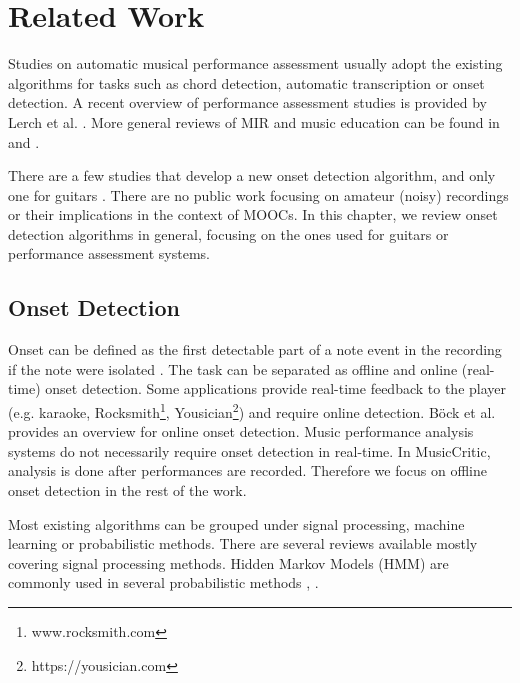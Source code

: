 \chapter{Related Work}

Studies on automatic musical performance assessment usually adopt the existing algorithms for tasks such as chord detection, automatic transcription or onset detection. A recent overview of performance assessment studies is provided by Lerch et al. \cite{lerch2019mpa}. More general reviews of MIR and music education can be found in \cite{dittmar2012} and \cite{percival2007effective}. 

There are a few studies that develop a new onset detection algorithm, and only one for guitars \cite{eremenko2020performance}. There are no public work focusing on amateur (noisy) recordings or their implications in the context of MOOCs. In this chapter, we review onset detection algorithms in general, focusing on the ones used for guitars or performance assessment systems. 

\section{Onset Detection}

Onset can be defined as the first detectable part of a note event in the recording if the note were isolated \cite{leveau2004}. The task can be separated as offline and online (real-time) onset detection. Some applications provide real-time feedback to the player (e.g. karaoke, Rocksmith\footnote{www.rocksmith.com}, Yousician\footnote{https://yousician.com}) and require online detection. B{\"o}ck et al. \cite{bock2012evaluating} provides an overview for online onset detection. Music performance analysis systems do not necessarily require onset detection in real-time. In MusicCritic, analysis is done after performances are recorded. Therefore we focus on offline onset detection in the rest of the work.

Most existing algorithms can be grouped under signal processing, machine learning or probabilistic methods. There are several reviews \cite{hainsworth2003onset} \cite{collins2005comparison} \cite{bello2005tutorial} \cite{dixon2006onset} available mostly covering signal processing methods. Hidden Markov Models (HMM) are commonly used in several probabilistic methods \cite{abdallah2003unsupervised}, \cite{raphael2010music}.

